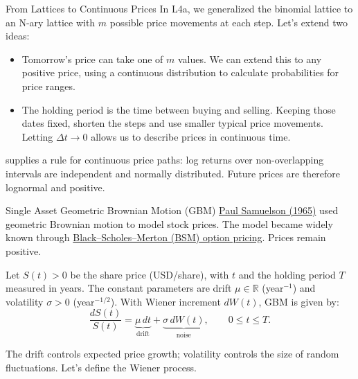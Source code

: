 \documentclass[aspectratio=169,11pt]{beamer}
\begin{document}
\begin{frame}{From Lattices to Continuous Prices}
  In L4a, we generalized the binomial lattice to an N-ary lattice with
  $m$ possible price movements at each step. Let's extend two ideas:

  \vspace{0.5em}
  \begin{itemize}\setlength{\itemsep}{0.6em}
    \item {} Tomorrow's price can take one of
      $m$ values. We can extend this to any positive price, using a continuous
      distribution to calculate probabilities for price ranges.
    \item {} The holding period is the time
      between buying and selling. Keeping those dates fixed, shorten the steps
      and use smaller typical price movements. Letting $\Delta t\to0$ allows
      us to describe prices in continuous time.
  \end{itemize}

  \vspace{0.5em}
   supplies a rule for continuous price paths: log returns over
  non-overlapping intervals are independent and normally distributed.
  Future prices are therefore lognormal and positive.
\end{frame}

\begin{frame}{Single Asset Geometric Brownian Motion (GBM)}
  \href{https://gwern.net/doc/economics/1965-samuelson.pdf}{Paul Samuelson (1965)}
  used geometric Brownian motion to model stock prices. The model became
  widely known through
  \href{https://www.cs.princeton.edu/courses/archive/fall08/cos323/papers/black_scholes73.pdf}{Black--Scholes--Merton (BSM) option pricing}.
  Prices remain positive.

  \vspace{0.5em}
  Let $S(t)>0$ be the share price (USD/share), with $t$ and the holding period
  $T$ measured in years. The constant parameters are drift $\mu\in\mathbb R$
  (year$^{-1}$) and volatility $\sigma>0$ (year$^{-1/2}$).
  With Wiener increment $dW(t)$, GBM is given by:
  \[
    \frac{dS(t)}{S(t)}
    =\underbrace{\mu\,dt}_{\text{drift}}
    +\underbrace{\sigma\,dW(t)}_{\text{noise}},
    \qquad 0\le t\le T.
  \]

  \vspace{0.5em}
  The drift controls expected price growth; volatility controls the size of
  random fluctuations. Let's define the Wiener process.
\end{frame}
\end{document}
